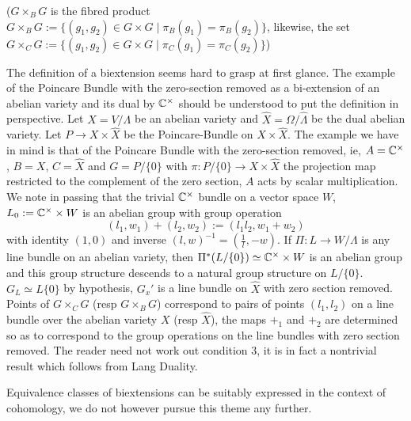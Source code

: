 \begin{paragraph}
\begin{definition}
\begin{equation*}
\end{equation*}
($G\times_B G$ is the fibred product $G\times_B G:=\{(g_1,g_2)\in G \times G\mid \pi_B(g_1)=\pi_B(g_2)\}$, likewise, the set $G\times_C G:=\{(g_1,g_2)\in G \times G\mid \pi_C(g_1)=\pi_C(g_2)\}$)
\end{definition}
The definition of a biextension seems hard to grasp at first glance. The example of the Poincare Bundle with the zero-section removed as a bi-extension of an abelian variety and its dual by ${\mathbb C}^{\times}$ should be understood to put the definition in perspective. Let $X=V/\Lambda$ be an abelian variety and $\hat{X}=\Omega/\hat{\Lambda}$ be the dual abelian variety. Let $P\rightarrow X\times \hat{X}$ be the Poincare-Bundle on $X\times \hat{X}$. The example we have in mind is that of the Poincare Bundle with the zero-section removed, ie, $A={\mathbb C}^{\times}$, $B=X$, $C=\hat{X}$ and $G=P/\{0\}$ with $\pi: P/\{0\}\rightarrow X\times \hat{X}$ the projection map restricted to the complement of the zero section, $A$ acts by scalar multiplication. We note in passing that the trivial ${\mathbb C}^{\times}$ bundle on a vector space $W$, $L_0:={\mathbb C}^{\times}\times W$ is an abelian group with group operation \begin{equation*}
(l_1,w_1)+(l_2,w_2):=(l_1 l_2, w_1+w_2)
\end{equation*}
with identity $(1,0)$ and inverse $(l,w)^{-1}=(\frac{1}{l},-w)$. If $\Pi:L\rightarrow W/\Lambda$ is any line bundle on an abelian variety, then $\Pi^*(L/\{0\})\simeq {\mathbb C}^{\times}\times W$ is an abelian group and this group structure descends to a natural group structure on $L/\{0\}$.
$G_L\simeq L\{0\}$ by hypothesis, $G_x'$ is a line bundle on $\hat{X}$ with zero section removed. Points of $G\times_C G$ (resp $G\times_B G$) correspond to pairs of points $(l_1,l_2)$ on a line bundle over the abelian variety $X$ (resp $\hat{X}$), the maps $+_1$ and $+_2$ are determined so as to correspond to the group operations on the line bundles with zero section removed. The reader need not work out condition 3, it is in fact a nontrivial result which follows from Lang Duality.
\end{paragraph}

\begin{paragraph}
{}Equivalence classes of biextensions can be suitably expressed in the context of cohomology, we do not however pursue this theme any further.
\end{paragraph}

